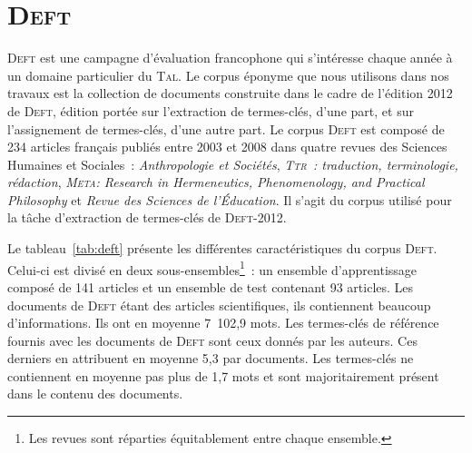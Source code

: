 
  \section[\textsc{Deft}]{\textsc{Deft}~\textnormal{\large\cite{paroubek2012deft}}}
  \label{sec:main-data_description-deft_data}
    \textsc{Deft} est une campagne d'évaluation francophone qui s'intéresse
    chaque année à un domaine particulier du \textsc{Tal}. Le corpus éponyme que
    nous utilisons dans nos travaux est la collection de documents construite
    dans le cadre de l'édition 2012 de \textsc{Deft}, édition portée sur
    l'extraction de termes-clés, d'une part, et sur l'assignement de
    termes-clés, d'une autre part. Le corpus \textsc{Deft} est composé de 234
    articles français publiés entre 2003 et 2008 dans quatre revues des Sciences
    Humaines et Sociales~: \textit{Anthropologie et Sociétés},
    \textit{\textsc{Ttr}~: traduction, terminologie, rédaction},
    \textit{\textsc{Meta}: Research in Hermeneutics, Phenomenology, and
    Practical Philosophy} et \textit{Revue des Sciences de l'Éducation}. Il
    s'agit du corpus utilisé pour la tâche d'extraction de termes-clés de
    \textsc{Deft}-2012.
    
    Le tableau~\ref{tab:deft} présente les différentes caractéristiques du
    corpus \textsc{Deft}. Celui-ci est divisé en deux
    sous-ensembles\footnote{Les revues sont réparties équitablement entre chaque
    ensemble.}~: un ensemble d'apprentissage composé de 141 articles et un
    ensemble de test contenant 93 articles. Les documents de \textsc{Deft} étant
    des articles scientifiques, ils contiennent beaucoup d'informations. Ils ont
    en moyenne 7~102,9 mots. Les termes-clés de référence fournis avec les
    documents de \textsc{Deft} sont ceux donnés par les auteurs. Ces derniers en
    attribuent en moyenne 5,3 par documents. Les termes-clés ne contiennent en
    moyenne pas plus de 1,7 mots et sont majoritairement présent dans le contenu
    des documents.
    \begin{table}[!h]
      \centering
      \caption{Corpus \textsc{Deft}
               \label{tab:deft}}
    \end{table}


